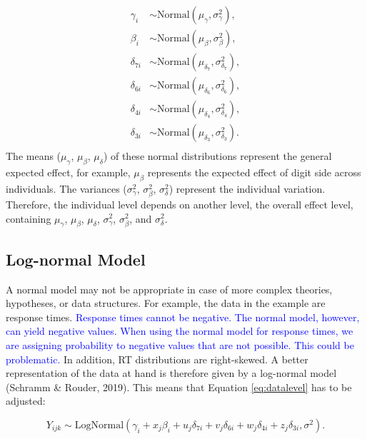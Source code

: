 \documentclass[
  english,
  doc,floatsintext]{apa6}
\begin{document}
\begin{equation}
\begin{aligned}
\gamma_{i} &\sim \text{Normal}(\mu_{\gamma}, \sigma^2_{\gamma}), \label{eq:fixedvsrandom}\\
\beta_{i} &\sim \text{Normal}(\mu_{\beta}, \sigma^2_{\beta}), \\
\delta_{7i} &\sim \text{Normal}(\mu_{\delta_{7}}, \sigma^2_{\delta_{7}}), \\
\delta_{6i} &\sim \text{Normal}(\mu_{\delta_{6}}, \sigma^2_{\delta_{6}}), \\
\delta_{4i} &\sim \text{Normal}(\mu_{\delta_{4}}, \sigma^2_{\delta_{4}}),\\
\delta_{3i} &\sim \text{Normal}(\mu_{\delta_{3}}, \sigma^2_{\delta_{3}}).\\
\end{aligned}
\end{equation}
The means (\(\mu_{\gamma}\), \(\mu_{\beta}\), \(\mu_{\delta}\)) of these normal distributions represent the general expected effect, for example, \(\mu_{\beta}\) represents the expected effect of digit side across individuals. The variances (\(\sigma^2_{\gamma}\), \(\sigma^2_{\beta}\), \(\sigma^2_{\delta}\)) represent the individual variation. Therefore, the individual level depends on another level, the overall effect level, containing \(\mu_{\gamma}\), \(\mu_{\beta}\), \(\mu_{\delta}\), \(\sigma^2_{\gamma}\), \(\sigma^2_{\beta}\), and \(\sigma^2_{\delta}\).

\hypertarget{log-normal-model}{%
\subsection{Log-normal Model}\label{log-normal-model}}

A normal model may not be appropriate in case of more complex theories, hypotheses, or data structures. For example, the data in the example are response times. \textcolor{blue}{Response times cannot be negative. The normal model, however, can yield negative values. When using the normal model for response times, we are assigning probability to negative values that are not possible. This could be problematic.} In addition, RT distributions are right-skewed. A better representation of the data at hand is therefore given by a log-normal model (Schramm \& Rouder, 2019). This means that Equation \eqref{eq:datalevel} has to be adjusted:

\begin{equation}
Y_{ijk} \sim \text{LogNormal}(\gamma_{i} + x_j \beta_{i} + u_j \delta_{7i} + v_j \delta_{6i} + w_j \delta_{4i} + z_j \delta_{3i}, \sigma^2).  
\end{equation}
\end{document}

